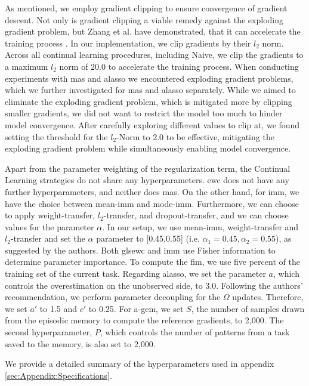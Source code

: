 As mentioned, we employ gradient clipping to ensure convergence of gradient descent. Not only is gradient clipping a viable remedy against the exploding
gradient problem, but Zhang et al. have demonstrated, that it can accelerate the training process \cite{zhang2019gradient}. In our implementation, we clip gradients by their
$l_2$ norm. Across all continual learning procedures, including Naive, we clip the gradients to a maximum $l_2$ norm of 20.0 to accelerate the training process.
When conducting experiments with \gls{mas} and \gls{alasso} we encountered exploding gradient problems, which we further investigated for \gls{mas} and \gls{alasso}
separately. While we aimed to eliminate the exploding gradient problem, which is mitigated more by clipping smaller gradients, we did not want to restrict the
model too much to hinder model convergence. After carefully exploring different values to clip at, we found setting the threshold for the $l_2$-Norm to 2.0
to be effective, mitigating the exploding gradient problem while simultaneously enabling model convergence. \par
Apart from the parameter weighting of the regularization term, the Continual Learning strategies do not share any hyperparameters. \gls{ewc} does not have
any further hyperparameters, and neither does \gls{mas}. On the other hand, for \gls{imm}, we have the choice between mean-\gls{imm} and mode-\gls{imm}. Furthermore,
we can choose to apply weight-transfer, $l_2$-transfer, and dropout-transfer, and we can choose values for the parameter $\alpha$. In our setup, we use mean-\gls{imm},
weight-transfer and $l_2$-transfer and set the $\alpha$ parameter to [0.45,0.55] (i.e. $\alpha_1 = 0.45, \alpha_2 = 0.55$), as suggested by the authors. Both gls{ewc} and
\gls{imm} use Fisher information to determine parameter importance. To compute the \gls{fim}, we use five percent of the training set of the current task.
Regarding \gls{alasso}, we set the parameter $a$, which controls the overestimation on the unobserved side, to 3.0. Following the authors' recommendation,
we perform parameter decoupling for the $\Omega$ updates. Therefore, we set $a'$ to 1.5 and $c'$ to 0.25. For \gls{a-gem}, we set $S$, the number of samples
drawn from the episodic memory to compute the reference gradients, to 2,000. The second hyperparameter, $P$, which controls the number of patterns from a task
saved to the memory, is also set to 2,000. \par
We provide a detailed summary of the hyperparameters used in appendix \ref{sec:Appendix:Specifications}.


